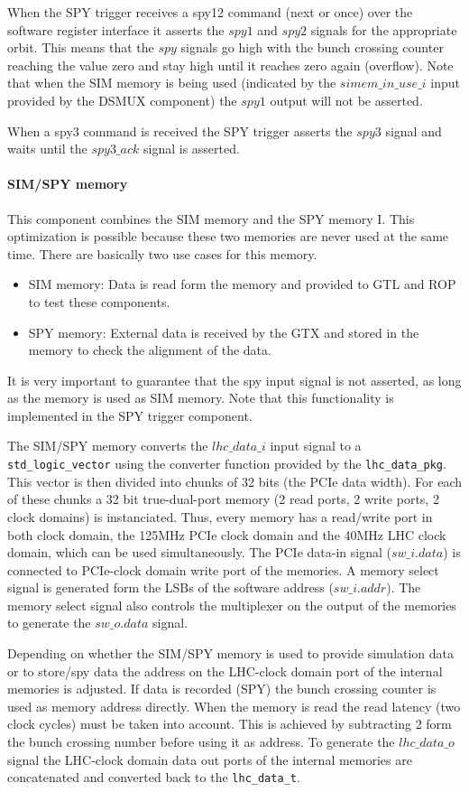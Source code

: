 When the SPY trigger receives a spy12 command (next or once) over the software register interface it asserts the $spy1$ and $spy2$ signals for the appropriate orbit.
This means that the $spy$ signals go high with the bunch crossing counter reaching the value zero and stay high until it reaches zero again (overflow). Note that when
the SIM memory is being used (indicated by the $simem\_in\_use\_i$ input provided by the DSMUX component) the $spy1$ output will not be asserted.

When a spy3 command is received the SPY trigger asserts the $spy3$ signal and waits until the $spy3\_ack$ signal is asserted.

\paragraph{SIM/SPY memory}
This component combines the SIM memory and the SPY memory I. This optimization is possible because these two memories are never used at the same time. There are basically
two use cases for this memory.
\begin{itemize}
\item SIM memory: Data is read form the memory and provided to GTL and ROP to test these components.
\item SPY memory: External data is received by the GTX and stored in the memory to check the alignment of the data.
\end{itemize}
It is very important to guarantee that the spy input signal is not asserted, as long as the memory is used as SIM memory. Note that this functionality is implemented in
the SPY trigger component.

The SIM/SPY memory converts the $lhc\_data\_i$ input signal to a \texttt{std\_logic\_vector} using the converter function provided by the \texttt{lhc\_data\_pkg}. This vector
is then divided into chunks of 32 bits (the PCIe data width). For each of these chunks a 32 bit true-dual-port memory (2 read ports, 2 write ports, 2 clock domains) is instanciated.
Thus, every memory has a read/write port in both clock domain, the 125MHz PCIe clock domain and the 40MHz LHC clock domain, which can be used simultaneously.
The PCIe data-in signal ($sw\_i.data$) is connected to PCIe-clock domain write port of the memories. A memory select signal is generated form the LSBs of the software address ($sw\_i.addr$).
The memory select signal also controls the multiplexer on the output of the memories to generate the $sw\_o.data$ signal.

Depending on whether the SIM/SPY memory is used to provide simulation data or to store/spy data the address on the LHC-clock domain port of the internal memories is adjusted.
If data is recorded (SPY) the bunch crossing counter is used as memory address directly.
When the memory is read the read latency (two clock cycles) must be taken into account.
This is achieved by subtracting 2 form the bunch crossing number before using it as address.
To generate the $lhc\_data\_o$ signal the LHC-clock domain data out ports of the internal memories are concatenated and converted back to the \texttt{lhc\_data\_t}.

